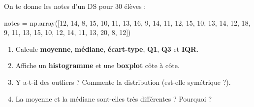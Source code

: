 \documentclass[
  french,
  11pt,
  a4paper,
]{scrbook}
\newenvironment{Shaded}{}{}
\newcommand{\DecValTok}[1]{\textcolor[rgb]{0.00,0.36,0.77}{#1}}
\newcommand{\NormalTok}[1]{\textcolor[rgb]{0.14,0.16,0.18}{#1}}
\newcommand{\OperatorTok}[1]{\textcolor[rgb]{0.14,0.16,0.18}{#1}}
\providecommand{\tightlist}{%
  \setlength{\itemsep}{0pt}\setlength{\parskip}{0pt}}
\begin{document}
\begin{tcolorbox}[enhanced jigsaw, arc=.35mm, bottomrule=.15mm, bottomtitle=1mm, breakable, colback=white, colbacktitle=quarto-callout-note-color!10!white, colframe=quarto-callout-note-color-frame, coltitle=black, left=2mm, leftrule=.75mm, opacityback=0, opacitybacktitle=0.6, rightrule=.15mm, title={📝 Énoncé}, titlerule=0mm, toprule=.15mm, toptitle=1mm]

On te donne les notes d'un DS pour 30 élèves :

\begin{Shaded}
\begin{Highlighting}[]
\NormalTok{notes }\OperatorTok{=}\NormalTok{ np.array([}\DecValTok{12}\NormalTok{, }\DecValTok{14}\NormalTok{, }\DecValTok{8}\NormalTok{, }\DecValTok{15}\NormalTok{, }\DecValTok{10}\NormalTok{, }\DecValTok{11}\NormalTok{, }\DecValTok{13}\NormalTok{, }\DecValTok{16}\NormalTok{, }\DecValTok{9}\NormalTok{, }\DecValTok{14}\NormalTok{, }
                  \DecValTok{11}\NormalTok{, }\DecValTok{12}\NormalTok{, }\DecValTok{15}\NormalTok{, }\DecValTok{10}\NormalTok{, }\DecValTok{13}\NormalTok{, }\DecValTok{14}\NormalTok{, }\DecValTok{12}\NormalTok{, }\DecValTok{18}\NormalTok{, }\DecValTok{9}\NormalTok{, }\DecValTok{11}\NormalTok{, }
                  \DecValTok{13}\NormalTok{, }\DecValTok{15}\NormalTok{, }\DecValTok{10}\NormalTok{, }\DecValTok{12}\NormalTok{, }\DecValTok{14}\NormalTok{, }\DecValTok{11}\NormalTok{, }\DecValTok{13}\NormalTok{, }\DecValTok{20}\NormalTok{, }\DecValTok{8}\NormalTok{, }\DecValTok{12}\NormalTok{])}
\end{Highlighting}
\end{Shaded}

\begin{enumerate}
\def\labelenumi{\arabic{enumi}.}
\tightlist
\item
  Calcule \textbf{moyenne}, \textbf{médiane}, \textbf{écart-type},
  \textbf{Q1}, \textbf{Q3} et \textbf{IQR}.
\item
  Affiche un \textbf{histogramme} et une \textbf{boxplot} côte à côte.
\item
  Y a-t-il des outliers ? Commente la distribution (est-elle symétrique
  ?).
\item
  La moyenne et la médiane sont-elles très différentes ? Pourquoi ?
\end{enumerate}

\end{tcolorbox}
\end{document}
